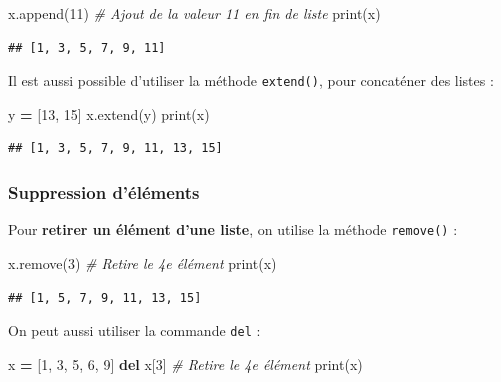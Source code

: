 \documentclass[12pt,]{book}
\newenvironment{Shaded}{\begin{snugshade}}{\end{snugshade}}
\newcommand{\KeywordTok}[1]{\textcolor[rgb]{0.13,0.29,0.53}{\textbf{#1}}}
\newcommand{\DecValTok}[1]{\textcolor[rgb]{0.00,0.00,0.81}{#1}}
\newcommand{\CommentTok}[1]{\textcolor[rgb]{0.56,0.35,0.01}{\textit{#1}}}
\newcommand{\OperatorTok}[1]{\textcolor[rgb]{0.81,0.36,0.00}{\textbf{#1}}}
\newcommand{\BuiltInTok}[1]{#1}
\newcommand{\NormalTok}[1]{#1}
\numberwithin{equation}{section}
\numberwithin{countremarque}{section}
\begin{document}
\begin{Shaded}
\begin{Highlighting}[]
\NormalTok{x.append(}\DecValTok{11}\NormalTok{) }\CommentTok{# Ajout de la valeur 11 en fin de liste}
\BuiltInTok{print}\NormalTok{(x)}
\end{Highlighting}
\end{Shaded}

\begin{lstlisting}
## [1, 3, 5, 7, 9, 11]
\end{lstlisting}

Il est aussi possible d'utiliser la méthode \texttt{extend()}, pour
concaténer des listes :

\begin{Shaded}
\begin{Highlighting}[]
\NormalTok{y }\OperatorTok{=}\NormalTok{ [}\DecValTok{13}\NormalTok{, }\DecValTok{15}\NormalTok{]}
\NormalTok{x.extend(y)}
\BuiltInTok{print}\NormalTok{(x)}
\end{Highlighting}
\end{Shaded}

\begin{lstlisting}
## [1, 3, 5, 7, 9, 11, 13, 15]
\end{lstlisting}

\subsubsection{Suppression d'éléments}\label{suppression-delements}

Pour \textbf{retirer un élément d'une liste}, on utilise la méthode
\texttt{remove()} :

\begin{Shaded}
\begin{Highlighting}[]
\NormalTok{x.remove(}\DecValTok{3}\NormalTok{) }\CommentTok{# Retire le 4e élément}
\BuiltInTok{print}\NormalTok{(x)}
\end{Highlighting}
\end{Shaded}

\begin{lstlisting}
## [1, 5, 7, 9, 11, 13, 15]
\end{lstlisting}

On peut aussi utiliser la commande \texttt{del} :

\begin{Shaded}
\begin{Highlighting}[]
\NormalTok{x }\OperatorTok{=}\NormalTok{ [}\DecValTok{1}\NormalTok{, }\DecValTok{3}\NormalTok{, }\DecValTok{5}\NormalTok{, }\DecValTok{6}\NormalTok{, }\DecValTok{9}\NormalTok{]}
\KeywordTok{del}\NormalTok{ x[}\DecValTok{3}\NormalTok{] }\CommentTok{# Retire le 4e élément}
\BuiltInTok{print}\NormalTok{(x)}
\end{Highlighting}
\end{Shaded}
\end{document}
